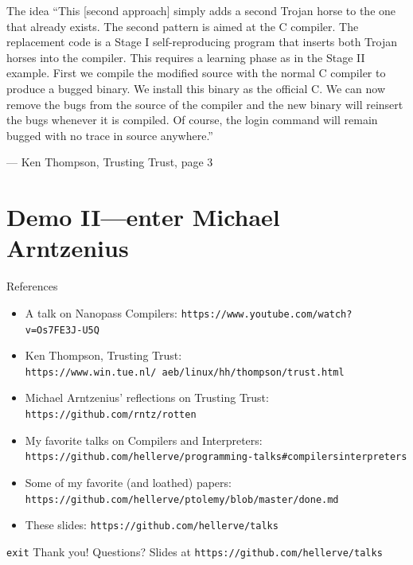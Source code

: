 \documentclass[aspectratio=169]{beamer}
\begin{document}
  \begin{frame}{The idea}
    “This [second approach] simply adds a second Trojan horse to the one that
     already exists. The second pattern is aimed at the C compiler. The
     replacement code is a Stage I self-reproducing program that inserts both
     Trojan horses into the compiler. This requires a learning phase as in
     the Stage II example. First we compile the modified source with the
     normal C compiler to produce a bugged binary. We install this binary as
     the official C. We can now remove the bugs from the source of the
     compiler and the new binary will reinsert the bugs whenever it is
     compiled. Of course, the login command will remain bugged with no trace
     in source anywhere.”

     \indent — Ken Thompson, Trusting Trust, page 3
  \end{frame}
  \section{Demo II—enter Michael Arntzenius}
  \begin{frame}{References}
    \begin{itemize}
      \item A talk on Nanopass Compilers: \texttt{https://www.youtube.com/watch?v=Os7FE3J-U5Q}
      \item Ken Thompson, Trusting Trust: \texttt{https://www.win.tue.nl/~aeb/linux/hh/thompson/trust.html}
      \item Michael Arntzenius’ reflections on Trusting Trust: \texttt{https://github.com/rntz/rotten}
      \item My favorite talks on Compilers and Interpreters: \texttt{https://github.com/hellerve/programming-talks\#compilersinterpreters}
      \item Some of my favorite (and loathed) papers: \texttt{https://github.com/hellerve/ptolemy/blob/master/done.md}
      \item These slides: \texttt{https://github.com/hellerve/talks}
    \end{itemize}
  \end{frame}
  \begin{frame}{\texttt{exit}}
    \Huge Thank you!
    \linebreak
    \linebreak
    \linebreak
    \small Questions?
    \linebreak
    \linebreak
    \tiny Slides at \texttt{https://github.com/hellerve/talks}
  \end{frame}
\end{document}
